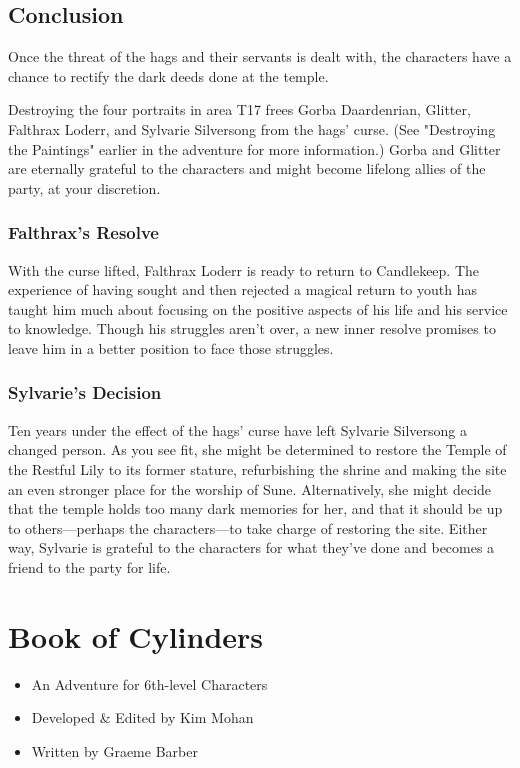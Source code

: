 \documentclass[10pt,a4paper,twoside,bg=print,twocolumn,openany,nodeprecatedcode]{dndbook}
\begin{document}
\section{Conclusion}
Once the threat of the hags and their servants is dealt with, the characters have a chance to rectify the dark deeds done at the temple.

Destroying the four portraits in area T17 frees Gorba Daardenrian, Glitter, Falthrax Loderr, and Sylvarie Silversong from the hags' curse. (See "Destroying the Paintings" earlier in the adventure for more information.) Gorba and Glitter are eternally grateful to the characters and might become lifelong allies of the party, at your discretion.

\subsection{Falthrax's Resolve}
With the curse lifted, Falthrax Loderr is ready to return to Candlekeep. The experience of having sought and then rejected a magical return to youth has taught him much about focusing on the positive aspects of his life and his service to knowledge. Though his struggles aren't over, a new inner resolve promises to leave him in a better position to face those struggles.

\subsection{Sylvarie's Decision}
Ten years under the effect of the hags' curse have left Sylvarie Silversong a changed person. As you see fit, she might be determined to restore the Temple of the Restful Lily to its former stature, refurbishing the shrine and making the site an even stronger place for the worship of Sune. Alternatively, she might decide that the temple holds too many dark memories for her, and that it should be up to others—perhaps the characters—to take charge of restoring the site. Either way, Sylvarie is grateful to the characters for what they've done and becomes a friend to the party for life.

\chapter{Book of Cylinders}

\begin{itemize}
\item An Adventure for 6th-level Characters
\item Developed \& Edited by Kim Mohan
\item Written by Graeme Barber
\end{itemize}
\end{document}
